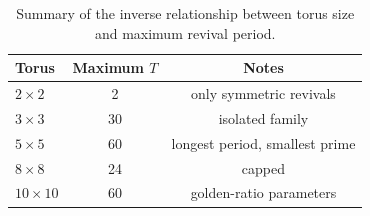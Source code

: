 \begin{table}[htbp]
  \centering
  \caption{Summary of the inverse relationship between torus size and
           maximum revival period.}
  \label{tab:discussion}
  \begin{tabular}{lcc}
    \toprule
    Torus & Maximum $T$ & Notes \\
    \midrule
    $2 \times 2$   & 2  & only symmetric revivals \\
    $3 \times 3$   & 30 & isolated family \\
    $5 \times 5$   & 60 & longest period, smallest prime \\
    $8 \times 8$   & 24 & capped \\
    $10 \times 10$ & 60 & golden-ratio parameters \\
    \bottomrule
  \end{tabular}
\end{table}
